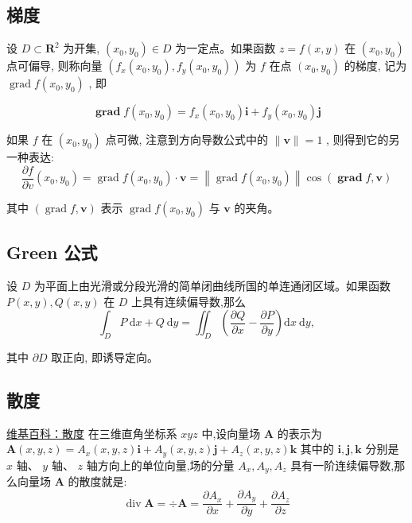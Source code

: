 \documentclass{book}
\begin{document}
\subsection{梯度} 设  $D \subset \mathbf{R}^{2}$  为开集,  $\left(x_{0}, y_{0}\right) \in D$  为一定点。如果函数  $z=   f(x, y)$  在  $\left(x_{0}, y_{0}\right)$  点可偏导, 则称向量  $\left(f_{x}\left(x_{0}, y_{0}\right), f_{y}\left(x_{0}, y_{0}\right)\right)$  为  $f$  在点  $\left(x_{0}\right. ,  \left.y_{0}\right)$  的梯度, 记为  $\operatorname{grad} f\left(x_{0}, y_{0}\right)$ , 即

\begin{equation}
    \boldsymbol{\operatorname { g r a d }} f\left(x_{0}, y_{0}\right)=f_{x}\left(x_{0}, y_{0}\right) \boldsymbol{i}+f_{y}\left(x_{0}, y_{0}\right) \boldsymbol{j}
\end{equation}

如果  $f$  在  $\left(x_{0}, y_{0}\right)$ 点可微, 注意到方向导数公式中的  $\|\boldsymbol{v}\|=1$ , 则得到它的另一种表达:
\begin{equation}
    \frac{\partial f}{\partial v}\left(x_{0}, y_{0}\right)=\operatorname{grad} f\left(x_{0}, y_{0}\right) \cdot \boldsymbol{v}=\left\|\operatorname{grad} f\left(x_{0}, y_{0}\right)\right\| \cos (\boldsymbol{\operatorname { g r a d }} f, \boldsymbol{v})
\end{equation}

其中  $(\operatorname{grad} f, \boldsymbol{v})$  表示  $\operatorname{grad} f\left(x_{0}, y_{0}\right)$  与  $\boldsymbol{v}$  的夹角。

\subsection{Green 公式}
设  $D$  为平面上由光滑或分段光滑的简单闭曲线所国的单连通闭区域。如果函数  $P(x, y), Q(x, y)$  在  $D$  上具有连续偏导数,那么
\begin{equation}
    \int_{D} P \mathrm{~d} x+Q \mathrm{~d} y=\iint_{D}\left(\frac{\partial Q}{\partial x}-\frac{\partial P}{\partial y}\right) \mathrm{d} x \mathrm{~d} y,
\end{equation}

其中 $\partial D$  取正向, 即诱导定向。

\subsection{散度}
\href{https://zh.wikipedia.org/zh-hans/%E6%95%A3%E5%BA%A6}{维基百科：散度} 
在三维直角坐标系  $x y z$  中,设向量场  $\boldsymbol{A}$  的表示为
$\boldsymbol{A}(x, y, z)=A_{x}(x, y, z) \boldsymbol{i}+A_{y}(x, y, z) \boldsymbol{j}+A_{z}(x, y, z) \boldsymbol{k}$ 其中的  $\boldsymbol{i}, \boldsymbol{j}, \boldsymbol{k} $ 分别是  $x$  轴、  $y$  轴、  $z$  轴方向上的单位向量,场的分量  $A_{x}, A_{y}, A_{z}$  具有一阶连续偏导数,那么向量场  $\boldsymbol{A}$  的散度就是:
\begin{equation}
    \operatorname{div} \boldsymbol{A}=\div \boldsymbol{A}=\dfrac{\partial A_{x}}{\partial x}+\dfrac{\partial A_{y}}{\partial y}+\dfrac{\partial A_{z}}{\partial z}
\end{equation}
\end{document}
